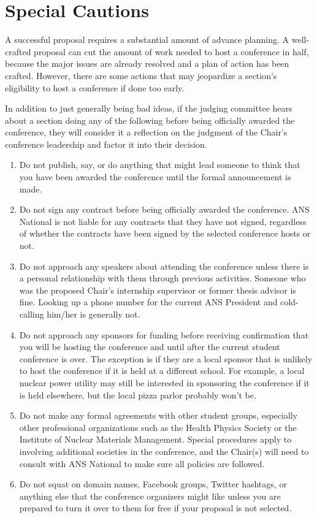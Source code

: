 \documentclass[12pt]{article}
\begin{document}
\section{Special Cautions}\label{sec:special_cautions}
A successful proposal requires a substantial amount of advance planning. A well-crafted proposal can cut the amount of work needed to host a conference in half, because the major issues are already resolved and a plan of action has been crafted.
However, there are some actions that may jeopardize a section's eligibility to host a conference if done too early.

In addition to just generally being bad ideas, if the judging committee hears about a section doing any of the following before being officially awarded the conference, they will consider it a reflection on the judgment of the Chair's conference leadership and factor it into their decision.

\begin{enumerate}
\item{Do not publish, say, or do anything that might lead someone to think that you have been awarded the conference until the formal announcement is made.}
\item{Do not sign any contract before being officially awarded the conference. ANS National is not liable for any contracts that they have not signed, regardless of whether the contracts have been signed by the selected conference hosts or not.}
\item{Do not approach any speakers about attending the conference unless there is a personal relationship with them through previous activities. Someone who was the proposed Chair’s internship supervisor or former thesis advisor is fine. Looking up a phone number for the current ANS President and cold-calling him/her is generally not.}
\item{Do not approach any sponsors for funding before receiving confirmation that you will be hosting the conference and until after the current student conference is over. The exception is if they are a local sponsor that is unlikely to host the conference if it is held at a different school. For example, a local nuclear power utility may still be interested in sponsoring the conference if it is held elsewhere, but the local pizza parlor probably won't be.}
\item{Do not make any formal agreements with other student groups, especially other
professional organizations such as the Health Physics Society or the Institute of
Nuclear Materials Management. Special procedures apply to involving additional societies in the conference, and the Chair(s) will need to consult with ANS
National to make sure all policies are followed.}
\item{Do not squat on domain names, Facebook groups, Twitter hashtags, or anything
else that the conference organizers might like unless you are prepared to turn it
over to them for free if your proposal is not selected.}
\end{enumerate}
\end{document}
